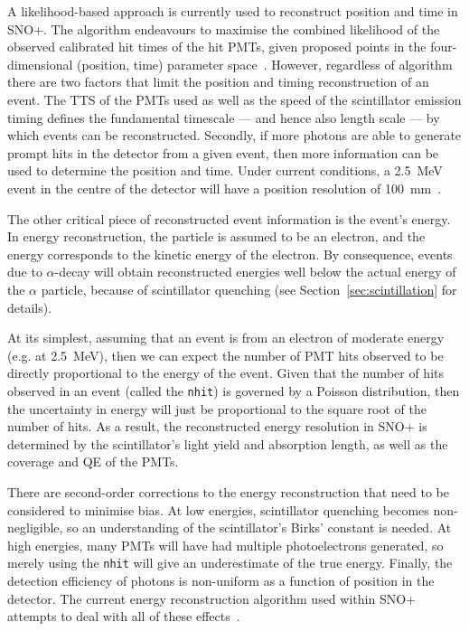 A likelihood-based approach is currently used to reconstruct position and time in SNO+. The algorithm endeavours to maximise the combined likelihood of the observed calibrated hit times of the hit PMTs, given proposed points in the four-dimensional (position, time) parameter space~\cite{jonesBackgroundRejectionNeutrinoless2011,coulterModellingReconstructionEvents2013,parkerMultiPDFMethodPosition2021}. %
However, regardless of algorithm there are two factors that limit the position and timing reconstruction of an event. The TTS of the PMTs used as well as the speed of the scintillator emission timing defines the fundamental timescale --- and hence also length scale --- by which events can be reconstructed. Secondly, if more photons are able to generate prompt hits in the detector from a given event, then more information can be used to determine the position and time. Under current conditions, a \SI{2.5}{\MeV} event in the centre of the detector will have a position resolution of \SI{100}{\mm}~\cite{parkerRecoordinatingScintEffectiveSpeedMultiPDF2023}. %

The other critical piece of reconstructed event information is the event's energy. In energy reconstruction, the particle is assumed to be an electron, and the energy corresponds to the kinetic energy of the electron. By consequence, events due to $\alpha$-decay will obtain reconstructed energies well below the actual energy of the $\alpha$ particle, because of scintillator quenching (see Section~\ref{sec:scintillation} for details).

At its simplest, assuming that an event is from an electron of moderate energy (e.g. at \SI{2.5}{\MeV}), then we can expect the number of PMT hits observed to be directly proportional to the energy of the event. Given that the number of hits observed in an event (called the \texttt{nhit}) is governed by a Poisson distribution, then the uncertainty in energy will just be proportional to the square root of the number of hits. As a result, the reconstructed energy resolution in SNO+ is determined by the scintillator's light yield and absorption length, as well as the coverage and QE of the PMTs.

There are second-order corrections to the energy reconstruction that need to be considered to minimise bias. At low energies, scintillator quenching becomes non-negligible, so an understanding of the scintillator's Birks' constant is needed. At high energies, many PMTs will have had multiple photoelectrons generated, so merely using the \texttt{nhit} will give an underestimate of the true energy. Finally, the detection efficiency of photons is non-uniform as a function of position in the detector. The current energy reconstruction algorithm used within SNO+ attempts to deal with all of these effects~\cite{mottramUpdatedFunctionalForm2015,kroupovaImprovingSensitivityNeutrinoless2020}. %

